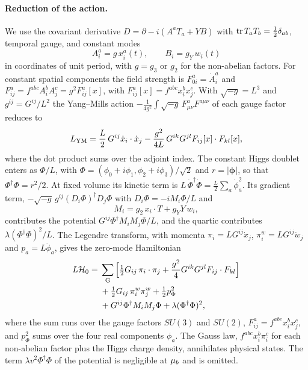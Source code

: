 \paragraph{Reduction of the action.}
We use the covariant derivative $D=\partial-i(A^aT_a+YB)$ with ${\rm tr}\,T_aT_b=\tfrac12\delta_{ab}$, temporal gauge, and constant modes
\begin{equation}
A^a_i=g\,x^a_i(t),\qquad B_i=g_Y\,w_i(t)
\label{eq:rA-xw}
\end{equation}
in coordinates of unit period, with $g=g_3$ or $g_2$ for the non-abelian factors.
For constant spatial components the field strength is $F^a_{0i}=\dot A^a_i$ and $F^a_{ij}=f^{abc}A^b_iA^c_j=g^2F^a_{ij}[x]$, with $F^a_{ij}[x]=f^{abc}x^b_ix^c_j$.
With $\sqrt{-g}=L^3$ and $g^{ij}=G^{ij}/L^2$ the Yang--Mills action $-\frac{1}{4g^2}\int\sqrt{-g}\,F^a_{\mu\nu}F^{a\mu\nu}$ of each gauge factor reduces to
\begin{equation}
L_{\rm YM}=\frac{L}{2}\,G^{ij}\dot x_i\cdot\dot x_j-\frac{g^2}{4L}\,G^{ik}G^{jl}F_{ij}[x]\cdot F_{kl}[x],
\end{equation}
where the dot product sums over the adjoint index.
The constant Higgs doublet enters as $\Phi/L$, with $\Phi=(\phi_0+i\phi_1,\phi_2+i\phi_3)/\sqrt2$ and $r=|\bm\phi|$, so that $\Phi^\dagger\Phi=r^2/2$.
At fixed volume its kinetic term is $L\,\dot\Phi^\dagger\dot\Phi=\tfrac{L}{2}\sum_a\dot\phi_a^2$.
Its gradient term, $-\sqrt{-g}\,g^{ij}(D_i\Phi)^\dagger D_j\Phi$ with $D_i\Phi=-iM_i\Phi/L$ and
\begin{equation}
M_i=g_2\,x_i\cdot T+g_YY\,w_i ,
\end{equation}
contributes the potential $G^{ij}\Phi^\dagger M_iM_j\Phi/L$, and the quartic contributes $\lambda(\Phi^\dagger\Phi)^2/L$.
The Legendre transform, with momenta $\pi_i=LG^{ij}\dot x_j$, $\pi^w_i=LG^{ij}\dot w_j$ and $p_a=L\dot\phi_a$, gives the zero-mode Hamiltonian
\begin{equation}
\begin{aligned}
L\mathcal H_0={}&\sum_{\rm G}\Big[\tfrac12G_{ij}\,\pi_i\cdot\pi_j+\frac{g^2}{4}G^{ik}G^{jl}F_{ij}\cdot F_{kl}\Big]\\
&+\tfrac12G_{ij}\,\pi^w_i\pi^w_j+\tfrac12p_\Phi^2\\
&+G^{ij}\Phi^\dagger M_iM_j\Phi+\lambda(\Phi^\dagger\Phi)^2,
\end{aligned}
\label{eq:rA-H0}
\end{equation}
where the sum runs over the gauge factors $SU(3)$ and $SU(2)$, $F^a_{ij}=f^{abc}x^b_ix^c_j$, and $p_\Phi^2$ sums over the four real components $\phi_a$.
The Gauss law, $f^{abc}x^b_i\pi^c_i$ for each non-abelian factor plus the Higgs charge density, annihilates physical states.
The term $\lambda v^2\Phi^\dagger\Phi$ of the potential is negligible at $\mu_b$ and is omitted.

